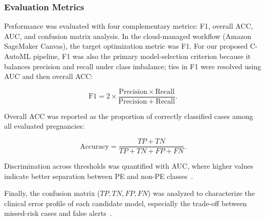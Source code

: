 \documentclass[diagnostics,article,accept,pdftex,moreauthors]{Definitions/mdpi}
\begin{document}
\subsubsection{Evaluation Metrics}
\label{sec:evaluation-metrics}
Performance was evaluated with four complementary metrics: \ac{F1},
overall \ac{ACC}, \ac{AUC}, and confusion matrix analysis. In the
cloud-managed workflow (Amazon SageMaker Canvas), the target
optimization metric was \ac{F1}. For our proposed \ac{C-AutoML} pipeline,
\ac{F1} was also the primary model-selection criterion because it
balances precision and recall under class imbalance; ties in \ac{F1}
were resolved using \ac{AUC} and then overall \ac{ACC}:
\begin{linenomath}
\begin{equation}
\mathrm{F1}=2\times\frac{\mathrm{Precision}\times\mathrm{Recall}}{\mathrm{Precision}+\mathrm{Recall}}.
\label{eq:f1-score}
\end{equation}
\end{linenomath}

Overall \ac{ACC} was reported as the proportion of correctly
classified cases among all evaluated pregnancies:
\begin{linenomath}
\begin{equation}
\mathrm{Accuracy}=\frac{TP+TN}{TP+TN+FP+FN}.
\label{eq:accuracy}
\end{equation}
\end{linenomath}

Discrimination across thresholds was quantified with \ac{AUC}, where
higher values indicate better separation between \ac{PE} and
non-\ac{PE} classes~\cite{fawcett2006roc}.

Finally, the confusion matrix (\(TP, TN, FP, FN\)) was analyzed to
characterize the clinical error profile of each candidate model,
especially the trade-off between missed-risk cases and false
alerts~\cite{sokolova2009systematic,powers2011evaluation}.
\end{document}
